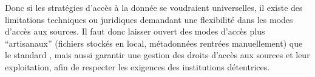 \vspace{2cm}

Donc si les stratégies d'accès à la donnée se voudraient universelles,
il existe des limitations techniques ou juridiques demandant une
flexibilité dans les modes d'accès aux sources. Il faut donc laisser
ouvert des modes d'accès plus ``artisanaux'' (fichiers stockés en local,
métadonnées rentrées manuellement) que le standard \iiif, mais aussi
garantir une gestion des droits d'accès aux sources et leur
exploitation, afin de respecter les exigences des
institutions détentrices. 


